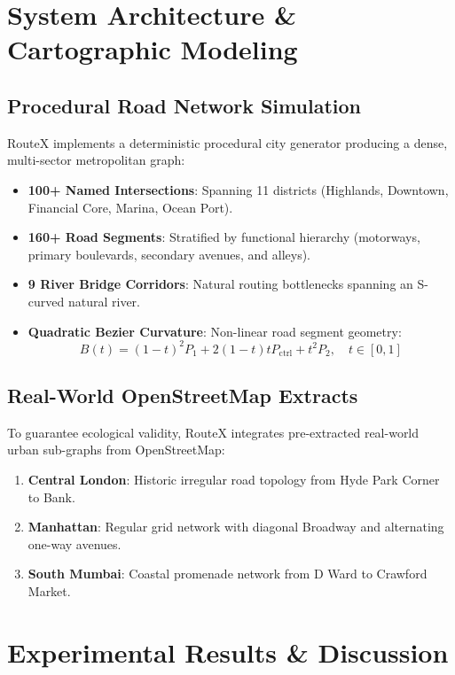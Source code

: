 \documentclass[conference]{IEEEtran}
\begin{document}
\section{System Architecture \& Cartographic Modeling}

\subsection{Procedural Road Network Simulation}
RouteX implements a deterministic procedural city generator producing a dense, multi-sector metropolitan graph:
\begin{itemize}
    \item \textbf{100+ Named Intersections}: Spanning 11 districts (Highlands, Downtown, Financial Core, Marina, Ocean Port).
    \item \textbf{160+ Road Segments}: Stratified by functional hierarchy (motorways, primary boulevards, secondary avenues, and alleys).
    \item \textbf{9 River Bridge Corridors}: Natural routing bottlenecks spanning an S-curved natural river.
    \item \textbf{Quadratic Bezier Curvature}: Non-linear road segment geometry:
    \begin{equation}
    B(t) = (1-t)^2 P_1 + 2(1-t)t P_{\text{ctrl}} + t^2 P_2, \quad t \in [0, 1]
    \end{equation}
\end{itemize}

\subsection{Real-World OpenStreetMap Extracts}
To guarantee ecological validity, RouteX integrates pre-extracted real-world urban sub-graphs from OpenStreetMap:
\begin{enumerate}
    \item \textbf{Central London}: Historic irregular road topology from Hyde Park Corner to Bank.
    \item \textbf{Manhattan}: Regular grid network with diagonal Broadway and alternating one-way avenues.
    \item \textbf{South Mumbai}: Coastal promenade network from D Ward to Crawford Market.
\end{enumerate}

\section{Experimental Results \& Discussion}
\end{document}

